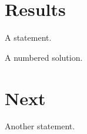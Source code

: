 \documentclass{book}
\begin{document}
\chapter{Results}
\begin{theorem}A statement.\end{theorem}
\begin{solution}A numbered solution.\end{solution}
\chapter{Next}
\begin{lemma}Another statement.\end{lemma}
\end{document}
